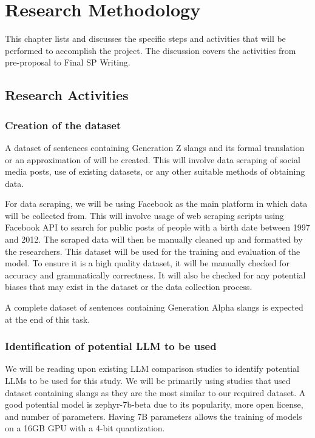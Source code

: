 \chapter{Research Methodology}
This chapter lists and discusses the specific steps and activities that will be performed  to accomplish the project. 
The discussion covers the activities from pre-proposal to Final SP Writing.

\section{Research Activities}
\subsection{Creation of the dataset} 
A dataset of sentences containing Generation Z slangs and its formal translation or an approximation of will be created.
This will involve data scraping of social media posts, use of existing datasets, or any other suitable methods of obtaining data.

For data scraping, we will be using Facebook as the main platform in which data will be collected from.
This will involve usage of web scraping scripts using Facebook API to search for public posts of people with a birth date between 1997 and 2012.
The scraped data will then be manually cleaned up and formatted by the researchers.
This dataset will be used for the training and evaluation of the model.
To ensure it is a high quality dataset, it will be manually checked for accuracy and grammatically correctness.
It will also be checked for any potential biases that may exist in the dataset or the data collection process.

A complete dataset of sentences containing Generation Alpha slangs is expected at the end of this task. 

\subsection{Identification of potential LLM to be used}
We will be reading upon existing LLM comparison studies to identify potential LLMs to be used for this study.
We will be primarily using studies that used dataset containing slangs as they are the most similar to our required dataset.
A good potential model is zephyr-7b-beta due to its popularity, more open license, and number of parameters.
Having 7B parameters allows the training of models on a 16GB GPU with a 4-bit quantization.

